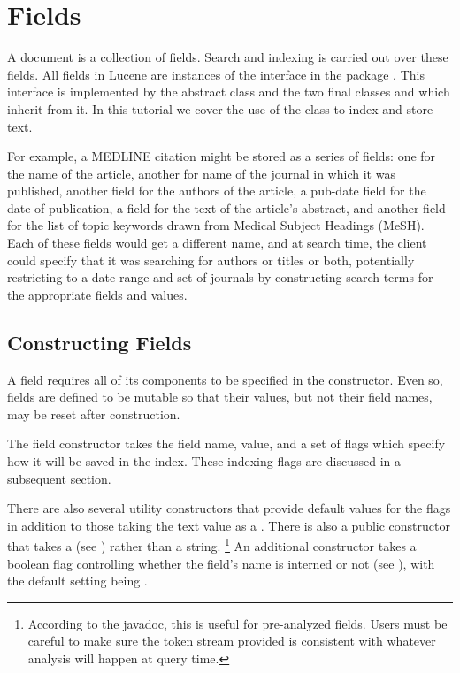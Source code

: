 \section{Fields}

A document is a collection of fields.
Search and indexing is carried out over these fields.
All fields in Lucene are instances of the  interface
in the package .  This interface is 
implemented by the abstract class  and the
two final classes  and  which inherit
from it.  In this tutorial we cover the use of the class 
to index and store text.

For example, a MEDLINE citation might be stored as a series
of fields: one for the name of the article, another for name of
the journal in which it was published, another field for the authors
of the article, a pub-date field for the date of publication, a field
for the text of the article's abstract, and another field for the list
of topic keywords drawn from Medical Subject Headings (MeSH).  Each of
these fields would get a different name, and at search time, the
client could specify that it was searching for authors or titles or
both, potentially restricting to a date range and set of journals
by constructing search terms for the appropriate fields and values.


\subsection{Constructing Fields}

A field requires all of its components to be specified in the
constructor.  Even so, fields are defined to be mutable so that their
values, but not their field names, may be reset after construction.

The field constructor takes the field name, value, and a set of flags
which specify how it will be saved in the index.
These indexing flags are discussed in a subsequent section.

There are also several utility constructors that provide default
values for the flags in addition to those taking the text value as a
.  There is also a public constructor that takes a
 (see ) rather than a
string.%
%
\footnote{According to the javadoc,
this is useful for pre-analyzed fields.
Users must be careful to make sure the token stream provided is
consistent with whatever analysis will happen at query time.}
%
An additional constructor takes a boolean flag controlling whether
the field's name is interned or not (see ), with
the default setting being .


